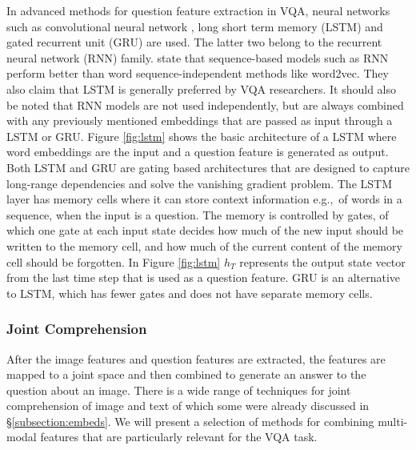 \documentclass{article}
\begin{document}
In advanced methods for question feature extraction in VQA, neural networks such as convolutional neural network \citep{krizhevsky2012imagenet}, long short term memory (LSTM) \citep{lstm} and gated recurrent unit (GRU) \citep{cho2014gru} are used. The latter two belong to the recurrent neural network (RNN) family. \citet{young2018recent} state that sequence-based models such as RNN perform better than word sequence-independent methods like word2vec. They also claim that LSTM is generally preferred by VQA researchers. It should also be noted that RNN models are not used independently, but are always combined with any previously mentioned embeddings that are passed as input through a LSTM or GRU. Figure \ref{fig:lstm} shows the basic architecture of a LSTM where word embeddings are the input and a question feature is generated as output. Both LSTM and GRU are gating based architectures that are designed to capture long-range dependencies and solve the vanishing gradient problem. The LSTM layer has memory cells where it can store context information e.g.,\ of words in a sequence, when the input is a question. The memory is controlled by gates, of which one gate at each input state decides how much of the new input should be written to the memory cell, and how much of the current content of the memory cell should be forgotten. In Figure \ref{fig:lstm} $h_T$ represents the output state vector from the last time step that is used as a question feature. GRU is an alternative to LSTM, which has fewer gates and does not have separate memory cells.

\subsubsection{Joint Comprehension} \label{subsubsection:attention}

After the image features and question features are extracted, the features are mapped to a joint space and then combined to generate an answer to the question about an image. There is a wide range of techniques for joint comprehension of image and text of which some were already discussed in \S \ref{subsection:embeds}. We will present a selection of methods for combining multi-modal features that are particularly relevant for the VQA task.
\end{document}
